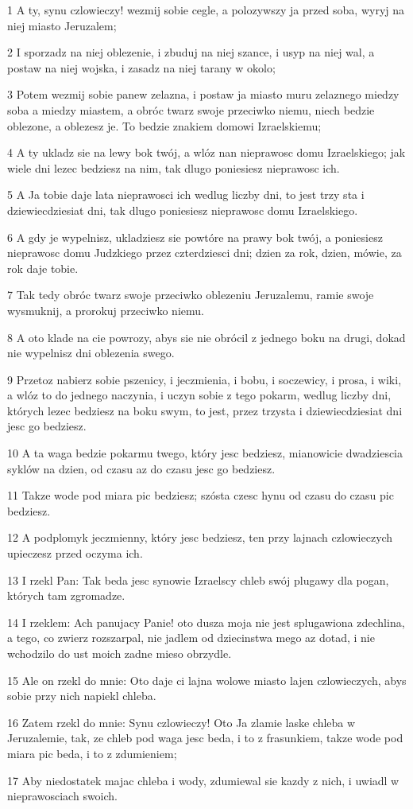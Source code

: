 \par 1 A ty, synu czlowieczy! wezmij sobie cegle, a polozywszy ja przed soba, wyryj na niej miasto Jeruzalem;
\par 2 I sporzadz na niej oblezenie, i zbuduj na niej szance, i usyp na niej wal, a postaw na niej wojska, i zasadz na niej tarany w okolo;
\par 3 Potem wezmij sobie panew zelazna, i postaw ja miasto muru zelaznego miedzy soba a miedzy miastem, a obróc twarz swoje przeciwko niemu, niech bedzie oblezone, a oblezesz je. To bedzie znakiem domowi Izraelskiemu;
\par 4 A ty ukladz sie na lewy bok twój, a wlóz nan nieprawosc domu Izraelskiego; jak wiele dni lezec bedziesz na nim, tak dlugo poniesiesz nieprawosc ich.
\par 5 A Ja tobie daje lata nieprawosci ich wedlug liczby dni, to jest trzy sta i dziewiecdziesiat dni, tak dlugo poniesiesz nieprawosc domu Izraelskiego.
\par 6 A gdy je wypelnisz, ukladziesz sie powtóre na prawy bok twój, a poniesiesz nieprawosc domu Judzkiego przez czterdziesci dni; dzien za rok, dzien, mówie, za rok daje tobie.
\par 7 Tak tedy obróc twarz swoje przeciwko oblezeniu Jeruzalemu, ramie swoje wysmuknij, a prorokuj przeciwko niemu.
\par 8 A oto klade na cie powrozy, abys sie nie obrócil z jednego boku na drugi, dokad nie wypelnisz dni oblezenia swego.
\par 9 Przetoz nabierz sobie pszenicy, i jeczmienia, i bobu, i soczewicy, i prosa, i wiki, a wlóz to do jednego naczynia, i uczyn sobie z tego pokarm, wedlug liczby dni, których lezec bedziesz na boku swym, to jest, przez trzysta i dziewiecdziesiat dni jesc go bedziesz.
\par 10 A ta waga bedzie pokarmu twego, który jesc bedziesz, mianowicie dwadziescia syklów na dzien, od czasu az do czasu jesc go bedziesz.
\par 11 Takze wode pod miara pic bedziesz; szósta czesc hynu od czasu do czasu pic bedziesz.
\par 12 A podplomyk jeczmienny, który jesc bedziesz, ten przy lajnach czlowieczych upieczesz przed oczyma ich.
\par 13 I rzekl Pan: Tak beda jesc synowie Izraelscy chleb swój plugawy dla pogan, których tam zgromadze.
\par 14 I rzeklem: Ach panujacy Panie! oto dusza moja nie jest splugawiona zdechlina, a tego, co zwierz rozszarpal, nie jadlem od dziecinstwa mego az dotad, i nie wchodzilo do ust moich zadne mieso obrzydle.
\par 15 Ale on rzekl do mnie: Oto daje ci lajna wolowe miasto lajen czlowieczych, abys sobie przy nich napiekl chleba.
\par 16 Zatem rzekl do mnie: Synu czlowieczy! Oto Ja zlamie laske chleba w Jeruzalemie, tak, ze chleb pod waga jesc beda, i to z frasunkiem, takze wode pod miara pic beda, i to z zdumieniem;
\par 17 Aby niedostatek majac chleba i wody, zdumiewal sie kazdy z nich, i uwiadl w nieprawosciach swoich.

